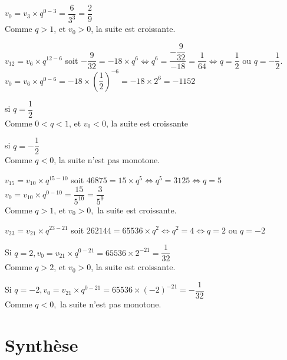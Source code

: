 \documentclass[a4paper,french]{book}
\begin{document}
\begin{enumMet}
\begin{enumMet}
        $v_{0}=v_{3} \times q^{0-3}=\dfrac{6}{3^{3}}=\dfrac{2}{9}$\\
        Comme $q>1$, et $v_{0}>0$, la suite est croissante.
        \item $v_{12}=v_{6} \times q^{12-6}$ soit $-\dfrac{9}{32}=-18 \times q^{6} \Longleftrightarrow q^{6}=\dfrac{-\dfrac{9}{32}}{-18}=\dfrac{1}{64} \Longleftrightarrow q=\dfrac{1}{2}$ ou $q=-\dfrac{1}{2}$.\\
        $v_{0}=v_{6} \times q^{0-6}=-18 \times\left(\dfrac{1}{2}\right)^{-6}=-18 \times 2^{6}=-1152$
        \begin{itemMet}
            \item si $q=\dfrac{1}{2}$\\
            Comme $0<q<1$, et $v_{0}<0$, la suite est croissante
            \item si $q=-\dfrac{1}{2}$\\
            Comme $q<0$, la suite n'est pas monotone.
        \end{itemMet}
        \item $v_{15}=v_{10} \times q^{15-10}$ soit $46875=15 \times q^{5} \Longleftrightarrow q^{5}=3125 \Longleftrightarrow q=5$\\
        $v_{0}=v_{10} \times q^{0-10}=\dfrac{15}{5^{10}}=\dfrac{3}{5^{9}}$\\
        Comme $q>1$, et $v_{0}>0,$ la suite est croissante.
        \item $v_{23}=v_{21} \times q^{23-21}$ soit $262144=65536 \times q^{2} \Longleftrightarrow q^{2}=4 \Longleftrightarrow q=2$ ou $q=-2$\\
        \begin{itemMet}
            \item Si $q=2, v_{0}=v_{21} \times q^{0-21}=65536 \times 2^{-21}=\dfrac{1}{32}$\\
            Comme $q>2$, et $v_{0}>0$, la suite est croissante.
            \item Si $q=-2, v_{0}=v_{21} \times q^{0-21}=65536 \times(-2)^{-21}=-\dfrac{1}{32}$\\
            Comme $q<0,$ la suite n'est pas monotone.
        \end{itemMet}
         
    \end{enumMet}
\end{enumMet}

\section*{Synthèse}
\end{document}
